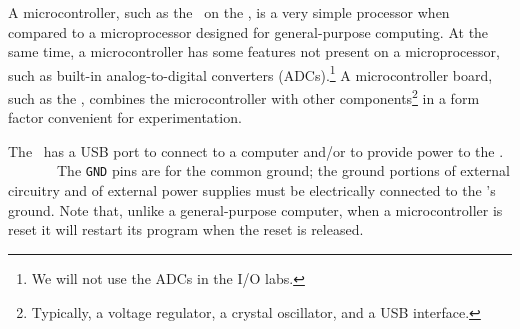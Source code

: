 


A microcontroller, such as the \microcontrollerreference\ on the \developmentboard, is a very simple processor when compared to a microprocessor designed for general-purpose computing.
At the same time, a microcontroller has some features not present on a microprocessor, such as built-in analog-to-digital converters (ADCs).\footnote{We will not use the ADCs in the I/O labs.} A microcontroller board, such as the \developmentboard, combines the microcontroller with other components\footnote{Typically, a voltage regulator, a crystal oscillator, and a USB interface.} in a form factor convenient for experimentation.

The \developmentboard\ has a USB port to connect to a computer and/or to provide power to the \developmentboard.
\icspdescription\
\pindescription\
\usartdescription\
\digitalpindescription\
\analogpindescription\
\regulatedvoltagedescription\
\unregulatedvoltagedescription\
The \texttt{GND} pins are for the common ground;
the ground portions of external circuitry and of external power supplies must be electrically connected to the \developmentboard's ground.
\resetdescription
Note that, unlike a general-purpose computer, when a microcontroller is reset it will restart its program when the reset is released.

